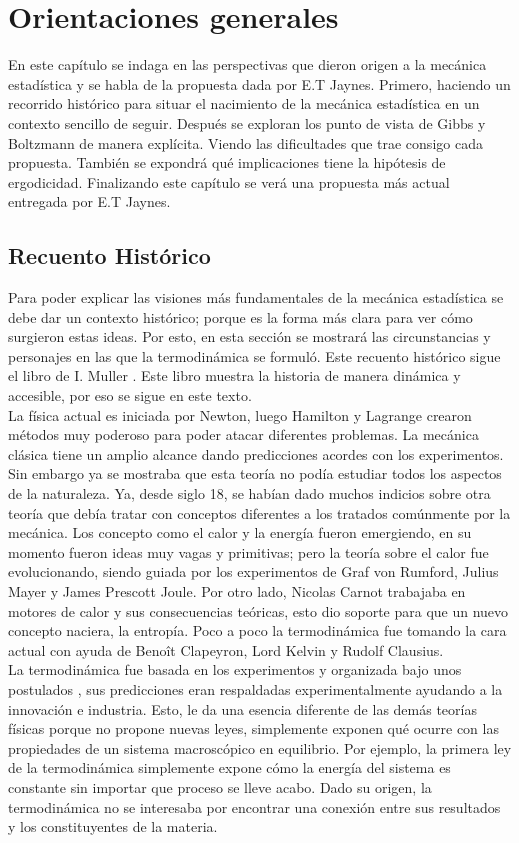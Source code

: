 \chapter{Orientaciones generales}

En este capítulo se indaga en las perspectivas que dieron origen a la mecánica estadística y se habla de la propuesta dada por E.T Jaynes. Primero, haciendo un recorrido histórico para situar el nacimiento de la mecánica estadística en un contexto sencillo de seguir. Después se exploran los punto de vista de Gibbs y Boltzmann de manera explícita. Viendo las dificultades que trae consigo cada propuesta. También se expondrá qué implicaciones tiene la hipótesis de ergodicidad. Finalizando este capítulo se verá una propuesta más actual entregada por E.T Jaynes.

\section{Recuento Histórico}
Para poder explicar las visiones más fundamentales de la mecánica estadística se debe dar un contexto histórico; porque es la forma más clara para ver cómo surgieron estas ideas. Por esto, en esta sección se mostrará las circunstancias y personajes en las que la termodinámica se formuló. Este recuento histórico sigue el libro de I. Muller \cite{MullerHistory}. Este libro muestra la historia de manera dinámica y accesible, por eso se sigue en este texto.
\\
La física actual es iniciada por Newton, luego Hamilton y Lagrange crearon métodos muy poderoso para poder atacar diferentes problemas. La mecánica clásica tiene un amplio alcance dando predicciones acordes con los experimentos. Sin embargo ya se mostraba que esta teoría no podía estudiar todos los aspectos de la naturaleza. Ya, desde siglo 18, se habían dado muchos indicios sobre otra teoría que debía tratar con conceptos diferentes a los tratados comúnmente por la mecánica. Los concepto como el calor y la energía fueron emergiendo, en su momento fueron ideas muy vagas y primitivas; pero la teoría sobre el calor fue evolucionando, siendo guiada por los experimentos de Graf von Rumford, Julius Mayer y James Prescott Joule. Por otro lado, Nicolas Carnot trabajaba en motores de calor y sus consecuencias teóricas, esto dio soporte para que un nuevo concepto naciera, la entropía. Poco a poco la termodinámica fue tomando la cara actual con ayuda de Benoît Clapeyron, Lord Kelvin y Rudolf Clausius. 
\\
La termodinámica fue basada en los experimentos y organizada bajo unos postulados \cite{CallenThermo}, sus predicciones eran respaldadas experimentalmente ayudando a la innovación e industria. Esto, le da una esencia diferente de las demás teorías físicas porque no propone nuevas leyes, simplemente exponen qué ocurre con las propiedades de un sistema macroscópico en equilibrio. Por ejemplo, la primera ley de la termodinámica simplemente expone cómo la energía del sistema es constante sin importar que proceso se lleve acabo. Dado su origen, la termodinámica no se interesaba por encontrar una conexión entre sus resultados y los constituyentes de la materia.
